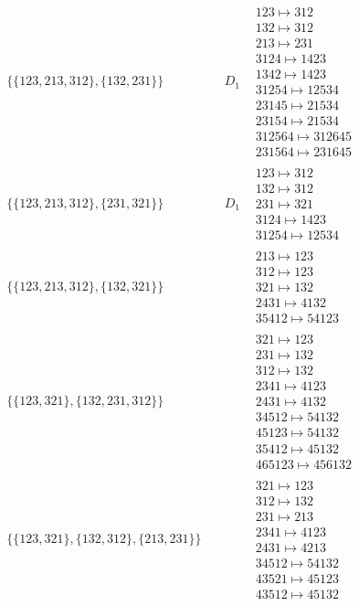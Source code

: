 \begin{tiny}
\begin{align}
\begin{matrix}
\end{matrix}
\\
\{\{123, 213, 312\}, \{132, 231\}\}
\quad
&
D_1
&
\begin{matrix}
123 \mapsto 312\\132 \mapsto 312\\213 \mapsto 231\\3124 \mapsto 1423\\1342 \mapsto 1423\\31254 \mapsto 12534\\23145 \mapsto 21534\\23154 \mapsto 21534\\312564 \mapsto 312645\\231564 \mapsto 231645
\end{matrix}
\\
\{\{123, 213, 312\}, \{231, 321\}\}
\quad
&
D_1
&
\begin{matrix}
123 \mapsto 312\\132 \mapsto 312\\231 \mapsto 321\\3124 \mapsto 1423\\31254 \mapsto 12534
\end{matrix}
\\
\{\{123, 213, 312\}, \{132, 321\}\}
\quad
&
\phantom{.}
&
\begin{matrix}
213 \mapsto 123\\312 \mapsto 123\\321 \mapsto 132\\2431 \mapsto 4132\\35412 \mapsto 54123
\end{matrix}
\\
\{\{123, 321\}, \{132, 231, 312\}\}
\quad
&
\phantom{.}
&
\begin{matrix}
321 \mapsto 123\\231 \mapsto 132\\312 \mapsto 132\\2341 \mapsto 4123\\2431 \mapsto 4132\\34512 \mapsto 54132\\45123 \mapsto 54132\\35412 \mapsto 45132\\465123 \mapsto 456132
\end{matrix}
\\
\{\{123, 321\}, \{132, 312\}, \{213, 231\}\}
\quad
&
\phantom{.}
&
\begin{matrix}
321 \mapsto 123\\312 \mapsto 132\\231 \mapsto 213\\2341 \mapsto 4123\\2431 \mapsto 4213\\34512 \mapsto 54132\\43521 \mapsto 45123\\43512 \mapsto 45132

\end{matrix}
\end{align}
\end{tiny}
